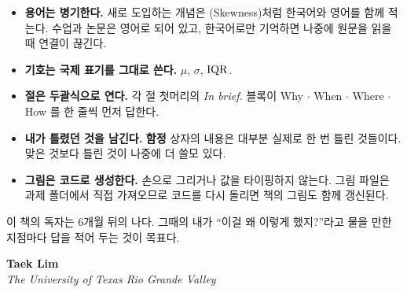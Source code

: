 \begin{itemize}
  \item \textbf{용어는 병기한다.} 새로 도입하는 개념은 (Skewness)처럼
        한국어와 영어를 함께 적는다. 수업과 논문은 영어로 되어 있고, 한국어로만
        기억하면 나중에 원문을 읽을 때 연결이 끊긴다.
  \item \textbf{기호는 국제 표기를 그대로 쓴다.} $\mu$, $\sigma$, $\mathrm{IQR}$.
  \item \textbf{절은 두괄식으로 연다.} 각 절 첫머리의 \textit{In brief.} 블록이
        Why $\cdot$ When $\cdot$ Where $\cdot$ How 를 한 줄씩 먼저 답한다.
  \item \textbf{내가 틀렸던 것을 남긴다.} \textbf{함정} 상자의 내용은 대부분 실제로
        한 번 틀린 것들이다. 맞은 것보다 틀린 것이 나중에 더 쓸모 있다.
  \item \textbf{그림은 코드로 생성한다.} 손으로 그리거나 값을 타이핑하지 않는다.
        그림 파일은 과제 폴더에서 직접 가져오므로 코드를 다시 돌리면 책의 그림도
        함께 갱신된다.
\end{itemize}

\begin{aside}[읽는 사람에게]
이 책의 독자는 6개월 뒤의 나다. 그때의 내가 ``이걸 왜 이렇게 했지?''라고 물을
만한 지점마다 답을 적어 두는 것이 목표다.
\end{aside}

\vfill
\noindent\textbf{Taek Lim}\\
\textit{The University of Texas Rio Grande Valley}
